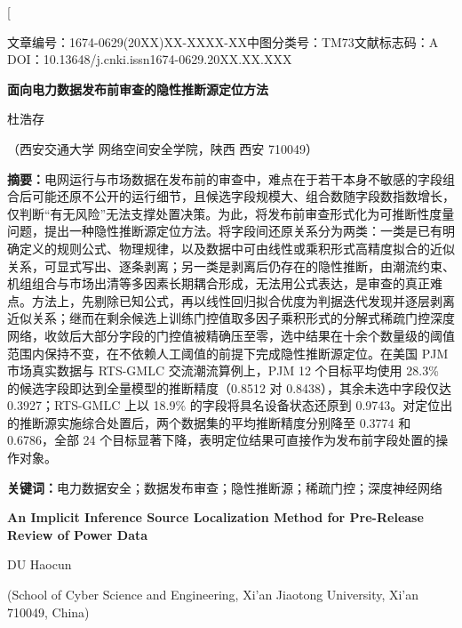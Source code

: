\documentclass[UTF8,zihao=5,twoside]{ctexart}
\newcommand{\articleinfo}{文章编号：1674-0629(20XX)XX-XXXX-XX\quad 中图分类号：TM73\quad 文献标志码：A\\
DOI：10.13648/j.cnki.issn1674-0629.20XX.XX.XXX}
\begin{document}
\twocolumn[

\begin{center}
{\articleinfo}\par\vspace{1.0em}
{\sffamily{}\bfseries 面向电力数据发布前审查的隐性推断源定位方法}\par\vspace{0.8em}
{杜浩存}\par\vspace{0.4em}
{（西安交通大学 网络空间安全学院，陕西 西安 710049）}\par\vspace{0.8em}
\end{center}

\noindent\textbf{摘要：}电网运行与市场数据在发布前的审查中，难点在于若干本身不敏感的字段组合后可能还原不公开的运行细节，且候选字段规模大、组合数随字段数指数增长，仅判断“有无风险”无法支撑处置决策。为此，将发布前审查形式化为可推断性度量问题，提出一种隐性推断源定位方法。将字段间还原关系分为两类：一类是已有明确定义的规则公式、物理规律，以及数据中可由线性或乘积形式高精度拟合的近似关系，可显式写出、逐条剥离；另一类是剥离后仍存在的隐性推断，由潮流约束、机组组合与市场出清等多因素长期耦合形成，无法用公式表达，是审查的真正难点。方法上，先剔除已知公式，再以线性回归拟合优度为判据迭代发现并逐层剥离近似关系；继而在剩余候选上训练门控值取多因子乘积形式的分解式稀疏门控深度网络，收敛后大部分字段的门控值被精确压至零，选中结果在十余个数量级的阈值范围内保持不变，在不依赖人工阈值的前提下完成隐性推断源定位。在美国 PJM 市场真实数据与 RTS-GMLC 交流潮流算例上，PJM 12 个目标平均使用 28.3\% 的候选字段即达到全量模型的推断精度（0.8512 对 0.8438），其余未选中字段仅达 0.3927；RTS-GMLC 上以 18.9\% 的字段将具名设备状态还原到 0.9743。对定位出的推断源实施综合处置后，两个数据集的平均推断精度分别降至 0.3774 和 0.6786，全部 24 个目标显著下降，表明定位结果可直接作为发布前字段处置的操作对象。\par
\noindent\textbf{关键词：}电力数据安全；数据发布审查；隐性推断源；稀疏门控；深度神经网络\par\vspace{0.8em}

\begin{center}
{\bfseries\large An Implicit Inference Source Localization Method for Pre-Release Review of Power Data}\par\vspace{0.5em}
{DU Haocun}\par\vspace{0.3em}
{\small (School of Cyber Science and Engineering, Xi'an Jiaotong University, Xi'an 710049, China)}\par\vspace{0.5em}
\end{center}
\end{document}
